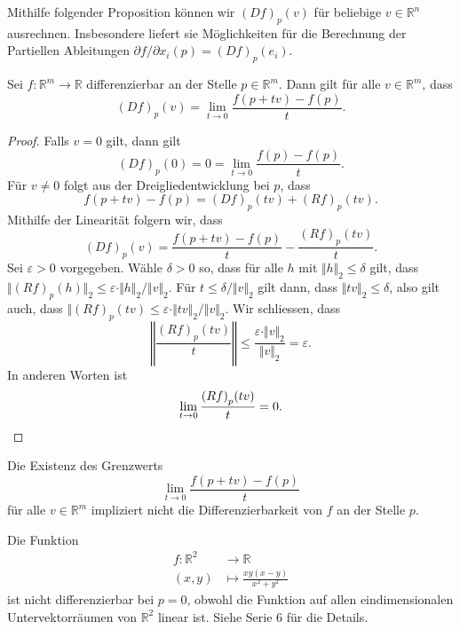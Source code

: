 \documentclass[../main.tex]{subfiles}
\begin{document}
Mithilfe folgender Proposition können wir ${(Df)}_p(v)$ 
für beliebige $v \in \mathbb{R}^n$ ausrechnen.
Insbesondere liefert sie Möglichkeiten für die
Berechnung der Partiellen Ableitungen
$\partial f / \partial x_i (p) = {(Df)}_p(e_i)$.

\begin{proposition*}
  Sei $f \colon \mathbb{R}^m \to \mathbb{R}$ differenzierbar
  an der Stelle $p \in \mathbb{R}^m$.
  Dann gilt für alle $v \in \mathbb{R}^m$, dass
  \[
    {(Df)}_p(v) = \lim_{t \to 0}
    \frac{f(p + tv) - f(p)}{t}.
  \]
\end{proposition*}

\begin{proof}
  Falls $v = 0$ gilt, dann gilt
  \[
    {(Df)}_p(0) = 0 = \lim_{t \to 0} \frac{f(p) - f(p)}{t}.
  \]
  Für $v \neq 0$ folgt aus der Dreigliedentwicklung
  bei $p$, dass
  \[
    f(p + tv) - f(p)
    = {(Df)}_p(tv) + {(Rf)}_p(tv).
  \]
  Mithilfe der Linearität folgern wir, dass
  \[
    {(Df)}_p(v) = \frac{f(p + tv) - f(p)}{t} - \frac{{(Rf)}_p(tv)}{t}.
  \]
  Sei $\varepsilon > 0$ vorgegeben. Wähle $\delta > 0$ 
  so, dass für alle $h$ mit $\Vert h \Vert_2 \leq \delta$ 
  gilt, dass $\Vert {(Rf)}_p(h) \Vert_2 \leq \varepsilon \cdot
  \Vert h \Vert_2 / \Vert v \Vert_2$.
  Für $t \leq \delta / \Vert v \Vert_2$ gilt dann,
  dass $\Vert tv \Vert_2 \leq \delta$,
  also gilt auch, dass
  $\Vert {(Rf)}_p (tv) \leq \varepsilon 
  \cdot \Vert t v \Vert_2 /\Vert v \Vert_2$.
  Wir schliessen, dass
  \[
    \left\Vert \frac{{(Rf)}_p(tv)}{t} \right\Vert
    \leq \frac{\varepsilon \cdot \Vert v \Vert_2}{\Vert v \Vert_2} 
    = \varepsilon.
  \]
  In anderen Worten ist
  \[
    \lim_{t \to 0} \frac{{(Rf)}_p(tv)}{t} = 0. \qedhere
  \]
\end{proof}

\begin{remark}
  Die Existenz des Grenzwerts
  \[
    \lim_{t \to 0} \frac{f(p + tv) - f(p)}{t}
  \]
  für alle $v \in \mathbb{R}^m$ impliziert nicht
  die Differenzierbarkeit von $f$ an der Stelle $p$.
\end{remark}

\begin{example}
  Die Funktion
  \begin{align*}
    f \colon \mathbb{R}^2 & \to \mathbb{R} \\
    (x, y) & \mapsto \frac{xy(x-y)}{x^2 + y^2}
  \end{align*}
  ist nicht differenzierbar bei $p = 0$,
  obwohl die Funktion auf allen eindimensionalen Untervektorräumen
  von $\mathbb{R}^2$ linear ist.
  Siehe Serie 6 für die Details.
\end{example}
\end{document}
